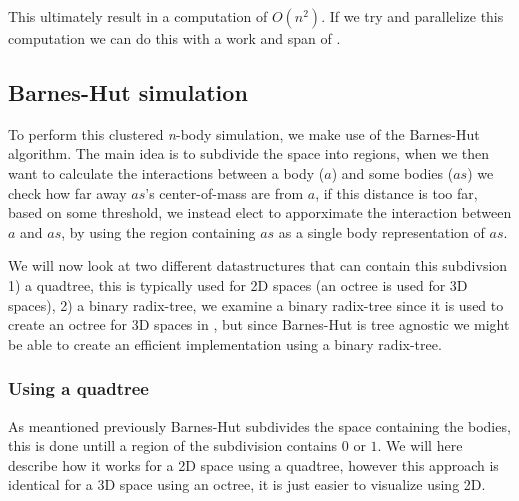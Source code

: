 This ultimately result in a computation of $O(n^2)$.
If we try and parallelize this computation we can do this with a work and span of .

\subsection{Barnes-Hut simulation}
To perform this clustered \textit{n}-body simulation, we make use of the
Barnes-Hut algorithm\cite{BH-algo}. The main idea is to subdivide the space into
regions, when we then want to calculate the interactions between a body ($a$)
and some bodies ($as$) we check how far away $as$'s center-of-mass are from $a$,
if this distance
is too far, based on some threshold, we instead elect to apporximate the
interaction between $a$ and $as$, by using the region containing $as$ as a
single body representation of $as$.

We will now look at two different datastructures that can contain this subdivsion
1) a quadtree, this is typically used for 2D spaces (an octree is used for 3D
spaces), 2) a binary radix-tree, we examine a binary radix-tree since it is used
to create an octree for 3D spaces in \cite{main-ref}, but since Barnes-Hut is
tree agnostic we might be able to create an efficient implementation using a
binary radix-tree.

\subsubsection{Using a quadtree}
As meantioned previously Barnes-Hut subdivides the space containing the bodies,
this is done untill a region of the subdivision contains $0$ or $1$. We will here
describe how it works for a 2D space using a quadtree, however this approach is
identical for a 3D space using an octree, it is just easier to visualize using
2D.


